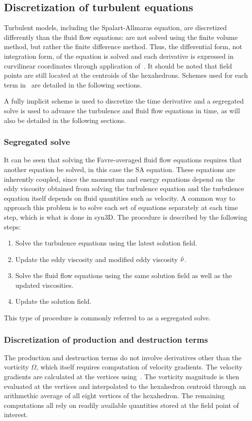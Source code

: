 \subsection{Discretization of turbulent equations}
\label{sec:synturb}
Turbulent models, including the Spalart-Allmaras equation, are discretized differently than the fluid flow equations: are not solved using the finite volume method, but rather the finite difference method. Thus, the differential form, not integration form, of the equation is solved and each derivative is expressed in curvilinear coordinates through application of~. It should be noted that field points are still located at the centroids of the hexahedrons. Schemes used for each term in~ are detailed in the following sections.

A fully implicit scheme is used to discretize the time derivative and a segregated solve is used to advance the turbulence and fluid flow equations in time, as will also be detailed in the following sections.
%
\subsubsection{Segregated solve}
%
It can be seen that solving the Favre-averaged fluid flow equations requires that another equation be solved, in this case the SA equation. These equations are inherently coupled, since the momentum and energy equations depend on the eddy viscosity obtained from solving the turbulence equation and the turbulence equation itself depends on fluid quantities such as velocity. A common way to approach this problem is to solve each set of equations separately at each time step, which is what is done in syn3D. The procedure is described by the following steps:
\begin{enumerate}
    \item Solve the turbulence equations using the latest solution field.
    \item Update the eddy viscosity and modified eddy viscosity $\sa$.
    \item Solve the fluid flow equations using the same solution field as well as the updated viscosities.
    \item Update the solution field.
\end{enumerate}
This type of procedure is commonly referred to as a segregated solve.
%
\subsubsection{Discretization of production and destruction terms}
The production and destruction terms do not involve derivatives other than the vorticity $\Omega$, which itself requires computation of velocity gradients. The velocity gradients are calculated at the vertices using~. The vorticity magnitude is then evaluated at the vertices and interpolated to the hexahedron centroid through an arithmethic average of all eight vertices of the hexahedron. The remaining computations all rely on readily available quantities stored at the field point of interest.
%
